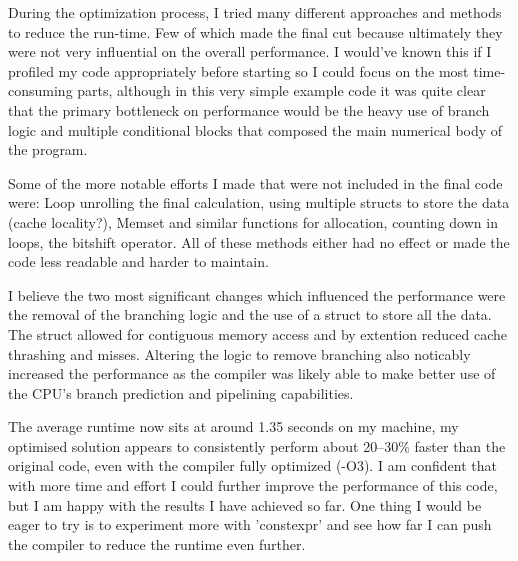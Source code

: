 \documentclass[10pt]{report}
\begin{document}
\vspace{0.5cm}
During the optimization process, I tried many different approaches and methods to reduce the run-time. Few of which made the final cut because ultimately they were not very influential on the overall performance. I would've known this if I profiled my code appropriately before starting so I could focus on the most time-consuming parts, although in this very simple example code it was quite clear that the primary bottleneck on performance would be the heavy use of branch logic and multiple conditional blocks that composed the main numerical body of the program.

\vspace{0.25cm}
Some of the more notable efforts I made that were not included in the final code were: Loop unrolling the final calculation, using multiple structs to store the data (cache locality?), Memset and similar functions for allocation, counting down in loops, the bitshift operator. All of these methods either had no effect or made the code less readable and harder to maintain.

\vspace{0.25cm}
I believe the two most significant changes which influenced the performance were the removal of the branching logic and the use of a struct to store all the data. The struct allowed for contiguous memory access and by extention reduced cache thrashing and misses. Altering the logic to remove branching also noticably increased the performance as the compiler was likely able to make better use of the CPU's branch prediction and pipelining capabilities.

\vspace{0.25cm}
The average runtime now sits at around 1.35 seconds on my machine, my optimised solution appears to consistently perform about 20--30\% faster than the original code, even with the compiler fully optimized (-O3). I am confident that with more time and effort I could further improve the performance of this code, but I am happy with the results I have achieved so far. One thing I would be eager to try is to experiment more with 'constexpr' and see how far I can push the compiler to reduce the runtime even further.
\end{document}
